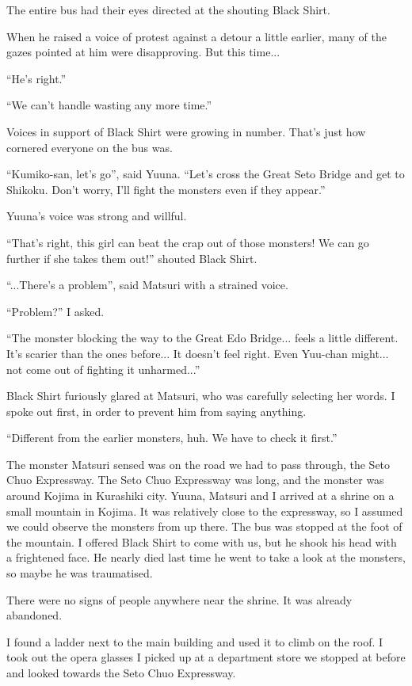 The entire bus had their eyes directed at the shouting Black Shirt.

When he raised a voice of protest against a detour a little earlier, many of the gazes pointed at him were disapproving. But this time...

``He's right.''

``We can't handle wasting any more time.''

Voices in support of Black Shirt were growing in number. That's just how cornered everyone on the bus was.

``Kumiko-san, let's go'', said Yuuna. ``Let's cross the Great Seto Bridge and get to Shikoku. Don't worry, I'll fight the monsters even if they appear.''

Yuuna's voice was strong and willful.

``That's right, this girl can beat the crap out of those monsters! We can go further if she takes them out!'' shouted Black Shirt.

``...There's a problem'', said Matsuri with a strained voice.

``Problem?'' I asked.

``The monster blocking the way to the Great Edo Bridge... feels a little different. It's scarier than the ones before... It doesn't feel right. Even Yuu-chan might... not come out of fighting it unharmed...''

Black Shirt furiously glared at Matsuri, who was carefully selecting her words. I spoke out first, in order to prevent him from saying anything.

``Different from the earlier monsters, huh. We have to check it first.''

The monster Matsuri sensed was on the road we had to pass through, the Seto Chuo Expressway. The Seto Chuo Expressway was long, and the monster was around Kojima in Kurashiki city.
Yuuna, Matsuri and I arrived at a shrine on a small mountain in Kojima. It was relatively close to the expressway, so I assumed we could observe the monsters from up there.
The bus was stopped at the foot of the mountain. I offered Black Shirt to come with us, but he shook his head with a frightened face. He nearly died last time he went to take a look at the monsters, so maybe he was traumatised.

There were no signs of people anywhere near the shrine. It was already abandoned.

I found a ladder next to the main building and used it to climb on the roof. I took out the opera glasses I picked up at a department store we stopped at before and looked towards the Seto Chuo Expressway.

